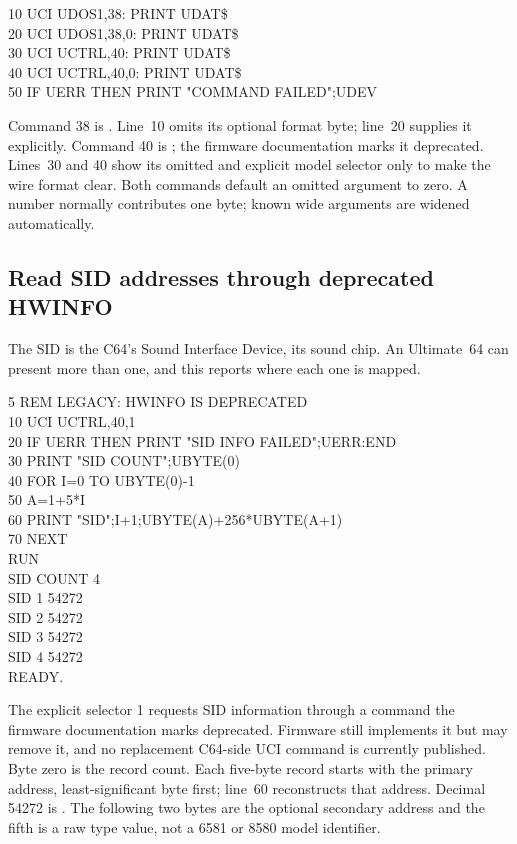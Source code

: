 \begin{screen}
10 UCI UDOS1,38: PRINT UDAT\$\\
20 UCI UDOS1,38,0: PRINT UDAT\$\\
30 UCI UCTRL,40: PRINT UDAT\$\\
40 UCI UCTRL,40,0: PRINT UDAT\$\\
50 IF UERR THEN PRINT "COMMAND FAILED";UDEV
\end{screen}

Command 38 is . Line~10 omits its optional format
byte; line~20 supplies it explicitly. Command 40 is
; the firmware documentation marks it deprecated.
Lines~30 and 40 show its omitted and explicit model selector only to make the
wire format clear. Both commands default an omitted argument to zero. A number
normally contributes one byte; known wide arguments are widened automatically.

\subsection*{Read SID addresses through deprecated HWINFO}

The SID is the C64's Sound Interface Device, its sound chip. An Ultimate~64
can present more than one, and this reports where each one is mapped.

\begin{screen}
5 REM LEGACY: HWINFO IS DEPRECATED\\
10 UCI UCTRL,40,1\\
20 IF UERR THEN PRINT "SID INFO FAILED";UERR:END\\
30 PRINT "SID COUNT";UBYTE(0)\\
40 FOR I=0 TO UBYTE(0)-1\\
50 A=1+5*I\\
60 PRINT "SID";I+1;UBYTE(A)+256*UBYTE(A+1)\\
70 NEXT\\
RUN\\
SID COUNT 4\\
SID 1  54272\\
SID 2  54272\\
SID 3  54272\\
SID 4  54272\\
READY.
\end{screen}

The explicit selector 1 requests SID information through a command the
firmware documentation marks deprecated. Firmware still implements it but may
remove it, and no replacement C64-side UCI command is currently published.
Byte zero is the record
count. Each five-byte record starts with the primary address, least-significant
byte first; line~60 reconstructs that address. Decimal 54272 is .
The following two bytes are the optional secondary address and the fifth is a
raw type value, not a 6581 or 8580 model identifier.

